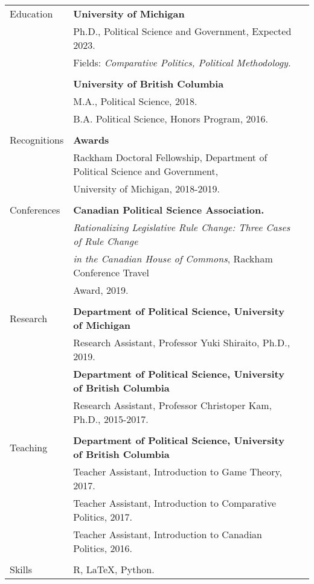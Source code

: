 \documentclass[letterpaper,11pt,oneside]{article}
\begin{document}
\bigskip
\noindent \begin{tabular}{@{} l l l}
 \Large{Education}   & \textbf{University of Michigan} \\
     & Ph.D., Political Science and Government, Expected 2023. \\
     & Fields: \textit{Comparative Politics, Political Methodology.} \\
     & \\
     & \textbf{University of British Columbia} \\
     & M.A., Political Science, 2018. \\
     & B.A. Political Science, Honors Program, 2016. \\
     & \\
\Large{Recognitions}   & \textbf{Awards} \\
        & Rackham Doctoral Fellowship, Department of Political Science and Government, \\
        & University of Michigan, 2018-2019. \\
     & \\

  \Large{Conferences} & \textbf{Canadian Political Science Association.} \\
        & \textit{Rationalizing Legislative Rule Change: Three Cases of Rule      Change} \\
        & \textit{in the Canadian House of Commons}, Rackham Conference Travel \\
        & Award, 2019. \\
        \\

  \Large{Research}
     & \textbf{Department of Political Science, University of Michigan} \\
     & Research Assistant, Professor Yuki Shiraito, Ph.D., 2019. \\
     & \textbf{Department of Political Science, University of British Columbia} \\
     & Research Assistant, Professor Christoper Kam, Ph.D., 2015-2017. \\
     & \\
 
  \Large{Teaching}   & \textbf{Department of Political Science, University of British Columbia} \\
     & Teacher Assistant, Introduction to Game Theory, 2017. \\     
     & Teacher Assistant, Introduction to Comparative Politics, 2017. \\
     & Teacher Assistant, Introduction to Canadian Politics, 2016. \\
     & \\
\Large{Skills}    & R, \LaTeX, Python. \\

\end{tabular}
\end{document}
